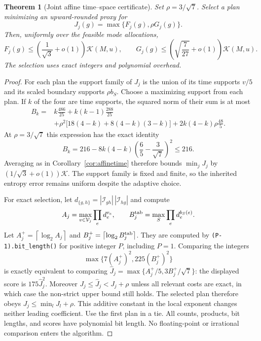 \documentclass[11pt]{article}
\newtheorem{theorem}{Theorem}[section]
\theoremstyle{definition}\newtheorem{definition}[theorem]{Definition}
\theoremstyle{remark}\newtheorem{remark}[theorem]{Remark}
\newcommand{\K}{\mathcal K}
\newcommand{\ceil}[1]{\left\lceil#1\right\rceil}
\begin{document}
\begin{theorem}[Joint affine time--space certificate]\label{thm:joint}
Set $\rho=3/\sqrt7$. Select a plan minimizing an upward-rounded proxy for
\[
 J_j(g)=\max\{F_j(g),\rho G_j(g)\}.
\]
Then, uniformly over the feasible mode allocations,
\[
 F_j(g)\le\left(\frac1{\sqrt3}+o(1)\right)\K(M,u),\qquad
 G_j(g)\le\left(\sqrt{\frac7{27}}+o(1)\right)\K(M,u).
\]
The selection uses exact integers and polynomial overhead.
\end{theorem}
\begin{proof}
For each plan the support family of $J_j$ is the union of its time supports
$v/5$ and its scaled boundary supports $\rho b_S$. Choose a maximizing
support from each plan. If $k$ of the four are time supports, the squared
norm of their sum is at most
\begin{align*}
 B_k={}&k\frac{486}{25}+k(k-1)\frac{288}{25}\\
 &+\rho^2\bigl[18(4-k)+8(4-k)(3-k)\bigr]
  +2k(4-k)\rho\frac{48}{5}.
\end{align*}
At $\rho=3/\sqrt7$ this expression has the exact identity
\begin{equation}\label{eq:jointidentity}
 B_k=216-8k(4-k)\left(\frac65-\frac3{\sqrt7}\right)^2\le216.
\end{equation}
Averaging as in Corollary~\ref{cor:affinetime} therefore bounds
$\min_jJ_j$ by $(1/\sqrt3+o(1))\K$. The support family is fixed and finite,
so the inherited entropy error remains uniform despite the adaptive choice.

For exact selection, let
$d_{\{g,h\}}=|\mathcal I_{gh}|\,|\mathcal I_{hg}|$ and compute
\[
 A_j=\max_{v\in\mathcal V_j}\prod_e d_e^{v_e},\qquad
 B_j^{\rm tab}=\max_S\prod_e d_e^{b_S(e)}.
\]
Let $A_j^+=\ceil{\log_2 A_j}$ and
$B_j^+=\ceil{\log_2 B_j^{\rm tab}}$. They are computed by
\texttt{(P-1).bit\_length()} for positive integer $P$, including $P=1$.
Comparing the integers
\begin{equation}\label{eq:selector}
 \max\{7(A_j^+)^2,225(B_j^+)^2\}
\end{equation}
is exactly equivalent to comparing
$\widehat J_j=\max\{A_j^+/5,3B_j^+/\sqrt7\}$: the displayed score is
$175\widehat J_j^2$. Moreover
$J_j\le\widehat J_j<J_j+\rho$ unless all relevant costs are exact, in
which case the non-strict upper bound still holds. The selected plan
therefore obeys $J_j\le\min_lJ_l+\rho$. This additive constant in the
local exponent changes neither leading coefficient. Use the first plan
in a tie. All counts, products, bit lengths, and scores have polynomial
bit length. No floating-point or irrational comparison enters the algorithm.
\end{proof}
\end{document}
